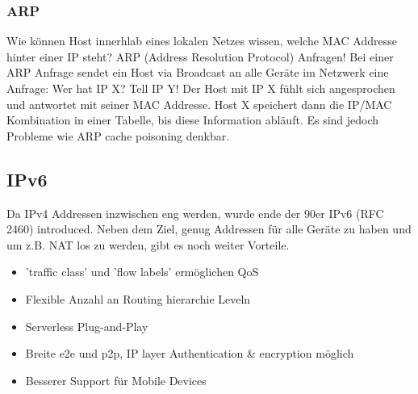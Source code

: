         \subsubsection{ARP}
            Wie können Host innerhlab eines lokalen Netzes wissen, welche MAC Addresse hinter einer IP steht? ARP (Address Resolution Protocol) Anfragen! Bei einer ARP Anfrage sendet ein Host via Broadcast an alle Geräte im Netzwerk eine Anfrage: Wer hat IP X? Tell IP Y! Der Host mit IP X fühlt sich angesprochen und antwortet mit seiner MAC Addresse. Host X speichert dann die IP/MAC Kombination in einer Tabelle, bis diese Information abläuft. Es sind jedoch Probleme wie ARP cache poisoning denkbar.

    \subsection{IPv6}
        Da IPv4 Addressen inzwischen eng werden, wurde ende der 90er IPv6 (RFC 2460) introduced. Neben dem Ziel, genug Addressen für alle Geräte zu haben und um z.B. NAT los zu werden, gibt es noch weiter Vorteile. 
        \begin{itemize}
            \item 'traffic class' und 'flow labels' ermöglichen QoS
            \item Flexible Anzahl an Routing hierarchie Leveln
            \item Serverless Plug-and-Play
            \item Breite e2e und p2p, IP layer Authentication \& encryption möglich
            \item Besserer Support für Mobile Devices
        \end{itemize}
